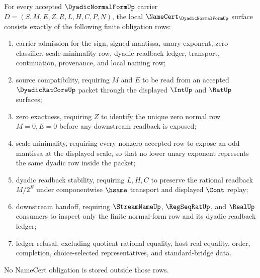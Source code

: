 \begin{theorem}
\label{thm:dyadic-normal-form-namecert-obligations}
For every accepted $\DyadicNormalFormUp$ carrier $D=(S,M,E,Z,R,L,H,C,P,N)$, the local $\NameCert_{\DyadicNormalFormUp}$ surface consists exactly of the following finite obligation rows:
\begin{enumerate}
\item carrier admission for the sign, signed mantissa, unary exponent, zero classifier, scale-minimality row, dyadic readback ledger, transport, continuation, provenance, and local naming row;
\item source compatibility, requiring $M$ and $E$ to be read from an accepted $\DyadicRatCoreUp$ packet through the displayed $\IntUp$ and $\RatUp$ surfaces;
\item zero exactness, requiring $Z$ to identify the unique zero normal row $M=0,E=0$ before any downstream readback is exposed;
\item scale-minimality, requiring every nonzero accepted row to expose an odd mantissa at the displayed scale, so that no lower unary exponent represents the same dyadic row inside the packet;
\item dyadic readback stability, requiring $L,H,C$ to preserve the rational readback $M/2^E$ under componentwise $\hsame$ transport and displayed $\Cont$ replay;
\item downstream handoff, requiring $\StreamNameUp$, $\RegSeqRatUp$, and $\RealUp$ consumers to inspect only the finite normal-form row and its dyadic readback ledger;
\item ledger refusal, excluding quotient rational equality, host real equality, order, completion, choice-selected representatives, and standard-bridge data.
\end{enumerate}
No NameCert obligation is stored outside those rows.
\end{theorem}
